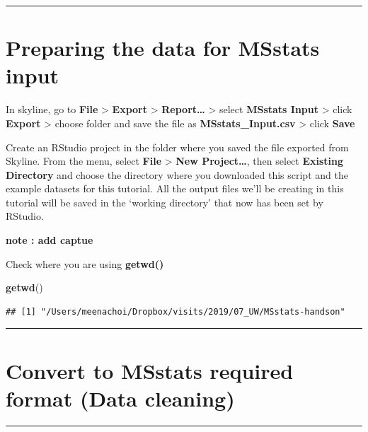 \documentclass[]{book}
\newenvironment{Shaded}{\begin{snugshade}}{\end{snugshade}}
\newcommand{\KeywordTok}[1]{\textcolor[rgb]{0.13,0.29,0.53}{\textbf{#1}}}
\newcommand{\NormalTok}[1]{#1}
\begin{document}
\begin{center}\rule{0.5\linewidth}{\linethickness}\end{center}

\hypertarget{preparing-the-data-for-msstats-input}{%
\section{Preparing the data for MSstats input}\label{preparing-the-data-for-msstats-input}}

In skyline, go to \textbf{File} \textgreater{} \textbf{Export} \textgreater{} \textbf{Report\ldots{}} \textgreater{} select \textbf{MSstats Input} \textgreater{} click \textbf{Export} \textgreater{} choose folder and save the file as \textbf{MSstats\_Input.csv} \textgreater{} click \textbf{Save}

Create an RStudio project in the folder where you saved the file exported from Skyline. From the menu, select \textbf{File} \textgreater{} \textbf{New Project\ldots{}}, then select \textbf{Existing Directory} and choose the directory where you downloaded this script and the example datasets for this tutorial. All the output files we'll be creating in this tutorial will be saved in the `working directory' that now has been set by RStudio.

\textbf{note : add captue}

Check where you are using \textbf{getwd()}

\begin{Shaded}
\begin{Highlighting}[]
\KeywordTok{getwd}\NormalTok{()}
\end{Highlighting}
\end{Shaded}

\begin{verbatim}
## [1] "/Users/meenachoi/Dropbox/visits/2019/07_UW/MSstats-handson"
\end{verbatim}

\begin{center}\rule{0.5\linewidth}{\linethickness}\end{center}

\hypertarget{convert-to-msstats-required-format-data-cleaning}{%
\section{Convert to MSstats required format (Data cleaning)}\label{convert-to-msstats-required-format-data-cleaning}}

\begin{center}\rule{0.5\linewidth}{\linethickness}\end{center}
\end{document}
